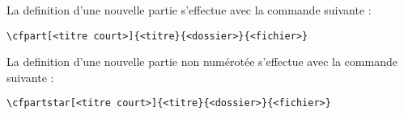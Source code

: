 La definition d'une nouvelle partie s'effectue avec la commande suivante :
\begin{verbatim}
\cfpart[<titre court>]{<titre}{<dossier>}{<fichier>}
\end{verbatim}
La definition d'une nouvelle partie non num\'erot\'ee s'effectue avec la commande suivante :
\begin{verbatim}
\cfpartstar[<titre court>]{<titre}{<dossier>}{<fichier>}
\end{verbatim}